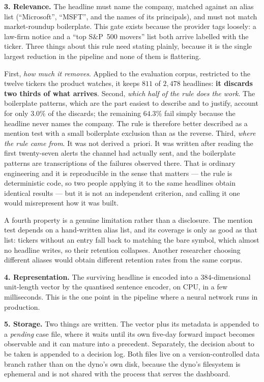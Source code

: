 \textbf{3. Relevance.} The headline must name the company, matched against an alias list (``Microsoft'',
``MSFT'', and the names of its principals), and must not match market-roundup boilerplate. This gate
exists because the provider tags loosely: a law-firm notice and a ``top S\&P~500 movers'' list both
arrive labelled with the ticker. Three things about this rule need stating plainly, because it is the
single largest reduction in the pipeline and none of them is flattering.

First, \emph{how much it removes}. Applied to the evaluation corpus, restricted to the twelve tickers
the product watches, it keeps $811$ of $2{,}478$ headlines: \textbf{it discards two thirds of what
arrives}. Second, \emph{which half of the rule does the work}. The boilerplate patterns, which are the
part easiest to describe and to justify, account for only $3.0\%$ of the discards; the remaining
$64.3\%$ fail simply because the headline never names the company. The rule is therefore better
described as a mention test with a small boilerplate exclusion than as the reverse. Third, \emph{where
the rule came from}. It was not derived a~priori. It was written after reading the first twenty-seven
alerts the channel had actually sent, and the boilerplate patterns are transcriptions of the failures
observed there. That is ordinary engineering and it is reproducible in the sense that matters --- the
rule is deterministic code, so two people applying it to the same headlines obtain identical results
--- but it is not an independent criterion, and calling it one would misrepresent how it was built.

A fourth property is a genuine limitation rather than a disclosure. The mention test depends on a
hand-written alias list, and its coverage is only as good as that list: tickers without an entry fall
back to matching the bare symbol, which almost no headline writes, so their retention collapses.
Another researcher choosing different aliases would obtain different retention rates from the same
corpus.

\textbf{4. Representation.} The surviving headline is encoded into a $384$-dimensional unit-length
vector by the quantised sentence encoder, on CPU, in a few milliseconds. This is the one point in the
pipeline where a neural network runs in production.

\textbf{5. Storage.} Two things are written. The vector plus its metadata is appended to a
\emph{pending} case file, where it waits until its own five-day forward impact becomes observable and
it can mature into a precedent. Separately, the decision about to be taken is appended to a decision
log. Both files live on a version-controlled data branch rather than on the dyno's own disk, because
the dyno's filesystem is ephemeral and is not shared with the process that serves the dashboard.

